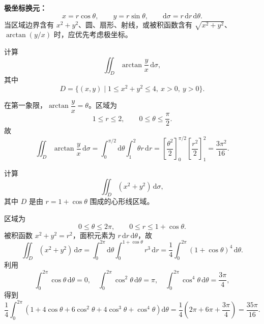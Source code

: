 \documentclass[answer,fontset=fandol]{THUExam}
\begin{document}
\newpage
{}

\begin{note}
\textbf{极坐标换元：}
\[
x=r\cos\theta,\qquad y=r\sin\theta,\qquad
\mathrm{d}\sigma=r\,\mathrm{d}r\,\mathrm{d}\theta.
\]
当区域边界含有 $x^2+y^2$、圆、扇形、射线，或被积函数含有 $\sqrt{x^2+y^2}$、$\arctan(y/x)$ 时，应优先考虑极坐标。
\end{note}
\bigskip

\begin{problem}
计算
\[
\iint_D \arctan\frac{y}{x}\,\mathrm{d}\sigma,
\]
其中
\[
D=\{(x,y)\mid 1\leqslant x^2+y^2\leqslant4,\ x>0,\ y>0\}.
\]
\end{problem}
\begin{solution}
在第一象限，$\arctan\dfrac{y}{x}=\theta$。区域为
\[
1\leqslant r\leqslant2,\qquad 0\leqslant\theta\leqslant\frac{\pi}{2}.
\]
故
\[
\iint_D \arctan\frac{y}{x}\,\mathrm{d}\sigma
=\int_0^{\pi/2}\mathrm{d}\theta\int_1^2 \theta r\,\mathrm{d}r
=\left[\frac{\theta^2}{2}\right]_0^{\pi/2}\left[\frac{r^2}{2}\right]_1^2
=\boxed{\frac{3\pi^2}{16}}.
\]
\end{solution}
\bigskip

\begin{problem}
计算
\[
\iint_D (x^2+y^2)\,\mathrm{d}\sigma,
\]
其中 $D$ 是由 $r=1+\cos\theta$ 围成的心形线区域。

\begin{center}
\end{center}
\end{problem}
\begin{solution}
区域为
\[
0\leqslant\theta\leqslant2\pi,\qquad 0\leqslant r\leqslant1+\cos\theta.
\]
被积函数 $x^2+y^2=r^2$，面积元素为 $r\,\mathrm{d}r\,\mathrm{d}\theta$，故
\[
\iint_D(x^2+y^2)\,\mathrm{d}\sigma
=\int_0^{2\pi}\mathrm{d}\theta\int_0^{1+\cos\theta}r^3\,\mathrm{d}r
=\frac14\int_0^{2\pi}(1+\cos\theta)^4\,\mathrm{d}\theta.
\]
利用
\[
\int_0^{2\pi}\cos\theta\,\mathrm{d}\theta=0,\quad
\int_0^{2\pi}\cos^2\theta\,\mathrm{d}\theta=\pi,\quad
\int_0^{2\pi}\cos^4\theta\,\mathrm{d}\theta=\frac{3\pi}{4},
\]
得到
\[
\frac14\int_0^{2\pi}(1+4\cos\theta+6\cos^2\theta+4\cos^3\theta+\cos^4\theta)\mathrm{d}\theta
=\frac14\left(2\pi+6\pi+\frac{3\pi}{4}\right)
=\boxed{\frac{35\pi}{16}}.
\]
\end{solution}
\bigskip
\end{document}
